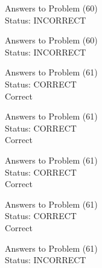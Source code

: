\documentclass[11pt]{article}
\begin{document}
\begin{minipage}[t]{0.5\textwidth}
  {\centering
  
  Answers to Problem (60)\\
  Status: INCORRECT\\
  
  }
\end{minipage}
\begin{minipage}[t]{0.5\textwidth}
  {\centering
  
  Answers to Problem (60)\\
  Status: INCORRECT\\
  
  }
\end{minipage}
\begin{minipage}[t]{0.5\textwidth}
  {\centering
  
  Answers to Problem (61)\\
  Status: CORRECT\\
  Correct\\
  }
\end{minipage}
\begin{minipage}[t]{0.5\textwidth}
  {\centering
  
  Answers to Problem (61)\\
  Status: CORRECT\\
  Correct\\
  }
\end{minipage}
\begin{minipage}[t]{0.5\textwidth}
  {\centering
  
  Answers to Problem (61)\\
  Status: CORRECT\\
  Correct\\
  }
\end{minipage}
\begin{minipage}[t]{0.5\textwidth}
  {\centering
  
  Answers to Problem (61)\\
  Status: CORRECT\\
  Correct\\
  }
\end{minipage}
\begin{minipage}[t]{0.5\textwidth}
  {\centering
  
  Answers to Problem (61)\\
  Status: INCORRECT\\
  
  }
\end{minipage}
\end{document}
